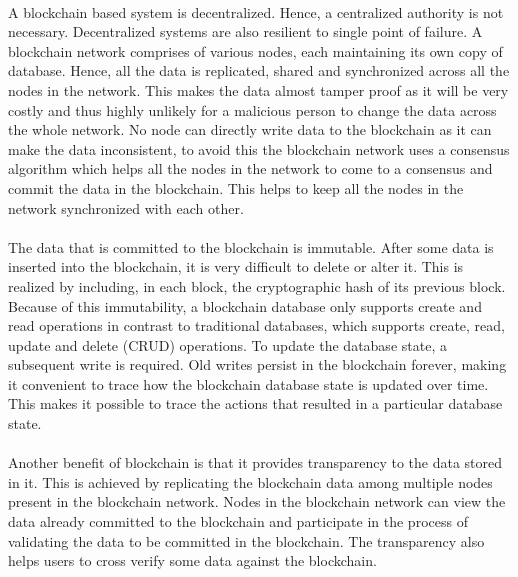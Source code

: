 \documentclass{article}
\begin{document}
        \paragraph{}
        A blockchain based system is decentralized. Hence, a centralized authority is not necessary. Decentralized systems are also resilient to single point of failure. A blockchain network comprises of various nodes, each maintaining its own copy of database. Hence, all the data is replicated, shared and synchronized across all the nodes in the network. This makes the data almost tamper proof as it will be very costly and thus highly unlikely for a malicious person to change the data across the whole network. No node can directly write data to the blockchain as it can make the data inconsistent, to avoid this the blockchain network uses a consensus algorithm which helps all the nodes in the network to come to a consensus and commit the data in the blockchain. This helps to keep all the nodes in the network synchronized with each other. 

        \paragraph{}
        The data that is committed to the blockchain is immutable. After some data is inserted into the blockchain, it is very difficult to delete or alter it. This is realized by including, in each block, the cryptographic hash of its previous block. Because of this immutability, a blockchain database only supports create and read operations in contrast to traditional databases, which supports create, read, update and delete (CRUD) operations. To update the database state, a subsequent write is required. Old writes persist in the blockchain forever, making it convenient to trace how the blockchain database state is updated over time. This makes it possible to trace the actions that resulted in a particular database state.

        \paragraph{}
        Another benefit of blockchain is that it provides transparency to the data stored in it. This is achieved by replicating the blockchain data among multiple nodes present in the blockchain network. Nodes in the blockchain network can view the data already committed to the blockchain and participate in the process of validating the data to be committed in the blockchain. The transparency also helps users to cross verify some data against the blockchain.  
\end{document}
